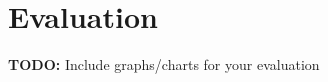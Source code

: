 \section{Evaluation}

\begin{frame}
  \textbf{TODO:} Include graphs/charts for your evaluation
\end{frame}
